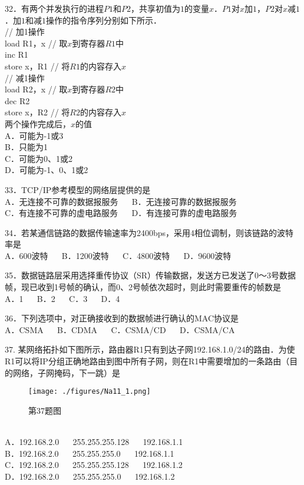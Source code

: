 32．有两个并发执行的进程$P1$和$P2$，共享初值为$1$的变量$x$．$P1$对$x$加$1$，$P2$对$x$减$1$．加$1$和减$1$操作的指令序列分别如下所示． \\

// 加1操作 \\
load R1，x  // 取$x$到寄存器$R1$中 \\
inc R1 \\
store x，R1  // 将$R1$的内容存入$x$ \\

// 减1操作 \\
load R2，x // 取$x$到寄存器$R2$中 \\
dec R2 \\
store x，R2 // 将$R2$的内容存入$x$ \\

两个操作完成后，$x$的值 \\
A．可能为-1或3 \\
B．只能为1 \\
C．可能为0、1或2 \\
D．可能为-1、0、1或2

33．TCP/IP参考模型的网络层提供的是 \\
A．无连接不可靠的数据报服务 $\quad$ B．无连接可靠的数据报服务 \\
C．有连接不可靠的虚电路服务 $\quad$ D．有连接可靠的虚电路服务

34．若某通信链路的数据传输速率为2400bps，采用4相位调制，则该链路的波特率是 \\
A．600波特 $\quad$ B．1200波特 $\quad$ C．4800波特 $\quad$ D．9600波特

35．数据链路层采用选择重传协议（SR）传输数据，发送方已发送了0～3号数据帧，现已收到1号帧的确认，而0、2号帧依次超时，则此时需要重传的帧数是 \\
A．1 $\quad$ B．2 $\quad$ C．3 $\quad$ D．4

36．下列选项中，对正确接收到的数据帧进行确认的MAC协议是 \\
A．CSMA $\quad$ B．CDMA $\quad$ C．CSMA/CD $\quad$ D．CSMA/CA

37. 某网络拓扑如下图所示，路由器R1只有到达子网192.168.1.0/24的路由．为使R1可以将IP分组正确地路由到图中所有子网，则在R1中需要增加的一条路由（目的网络，子网掩码，下一跳）是 \\
\begin{figure}[ht]
\centering
\texttt{[image: ./figures/Na11\_1.png]}
\caption{第37题图} \label{Na11_fig1}
\end{figure}
\\
A．192.168.2.0 $\quad$ 255.255.255.128 $\quad$ 192.168.1.1 \\
B．192.168.2.0 $\quad$ 255.255.255.0 $\quad$ 192.168.1.1 \\
C．192.168.2.0 $\quad$ 255.255.255.128 $\quad$ 192.168.1.2 \\
D．192.168.2.0 $\quad$ 255.255.255.0 $\quad$ 192.168.1.2 \\


